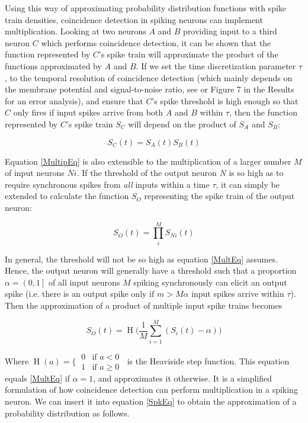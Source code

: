 Using this way of approximating probability distribution functions with spike train densities, coincidence detection in spiking neurons can implement multiplication. Looking at two neurons $A$ and $B$ providing input to a third neuron $C$ which performs coincidence detection, it can be shown that the function represented by $C$'s spike train will approximate the product of the functions approximated by $A$ and $B$. If we set the time discretization parameter $\tau$, to the temporal resolution of coincidence detection (which mainly depends on the membrane potential and signal-to-noise ratio, see \cite{Brette2012} or Figure 7 in the Results for an error analysis), and ensure that $C$'s spike threshold is high enough so that $C$ only fires if input spikes arrive from both $A$ and $B$ within $ \tau $, then the function represented by $C$'s spike train $ S_{C} $ will depend on the product of $ S_{A} $ and $ S_{B} $:

\begin{equation}\label{MultipEq}
S_{C}(t) = S_{A}(t) S_{B}(t)
\end{equation} 

Equation \eqref{MultipEq} is also extensible to the multiplication of a larger number $ M $ of input neurons $ Ni $. If the threshold of the output neuron $ N $ is so high as to require synchronous spikes from \textit{all} inputs within a time $ \tau $, it can simply be extended to calculate the function $ S_{O} $ representing the spike train of the output neuron:

\begin{equation}\label{MultEq}
S_{O}(t) = \prod_i^M S_{Ni}(t)
\end{equation} 

In general, the threshold will not be so high as equation \eqref{MultEq} assumes. Hence, the output neuron will generally have a threshold such that a proportion $ \alpha=\left( 0, 1 \right] $ of all input neurons $ M $ spiking synchronously can elicit an output spike (i.e. there is an output spike only if $ m > M \alpha $ input spikes arrive within $ \tau $). Then the approximation of a product of multiple input spike trains becomes

\begin{equation}\label{ThrshMultEq}
S_{O}(t) = \operatorname{H}\Big(\frac{1}{M} \sum_{i=1}^M (S_{i}(t) - \alpha) \Big)
\end{equation} 

Where $ \operatorname{H}(a)=\Big\{ \: \begin{matrix} 0 & \text{if }a<0 \\ 1 & \text{if }a\ge 0 \end{matrix} \: $ is the Heaviside step function. This equation equals \eqref{MultEq} if $ \alpha=1 $, and approximates it otherwise. It is a simplified formulation of how coincidence detection can perform multiplication in a spiking neuron. We can insert it into equation \eqref{SpkEq} to obtain the approximation of a probability distribution as follows. 

